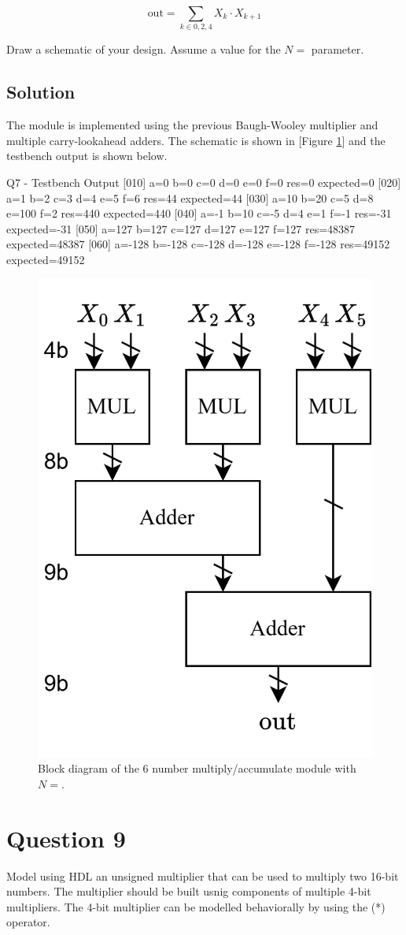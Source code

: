 \documentclass[../main.tex]{subfiles}
\begin{document}
$$
    \text{out} = \sum_{k \in {0, 2, 4}} X_k \cdot X_{k + 1}
$$

Draw a schematic of your design. Assume a value for the $N = $ parameter.

\subsection*{Solution}

The module is implemented using the previous Baugh-Wooley multiplier and multiple carry-lookahead adders. The schematic is shown in [Figure \ref{q8}] and the testbench output is shown below.

\begin{mintedterminal}{Q7 - Testbench Output}
[010] a=0 b=0 c=0 d=0 e=0 f=0 res=0 expected=0
[020] a=1 b=2 c=3 d=4 e=5 f=6 res=44 expected=44
[030] a=10 b=20 c=5 d=8 e=100 f=2 res=440 expected=440
[040] a=-1 b=10 c=-5 d=4 e=1 f=-1 res=-31 expected=-31
[050] a=127 b=127 c=127 d=127 e=127 f=127 res=48387 expected=48387
[060] a=-128 b=-128 c=-128 d=-128 e=-128 f=-128 res=49152 expected=49152
\end{mintedterminal}

\begin{figure}[h]
    \centering
    \includegraphics[width=0.4\linewidth]{assets/q8.png}
    \caption{Block diagram of the 6 number multiply/accumulate module with $N = $.}
    \label{q8}
\end{figure}

\newpage

\section{Question 9}

Model using HDL an unsigned multiplier that can be used to multiply two 16-bit numbers. The multiplier should be built usnig components of multiple 4-bit multipliers. The 4-bit multiplier can be modelled behaviorally by using the (*) operator.
\end{document}
